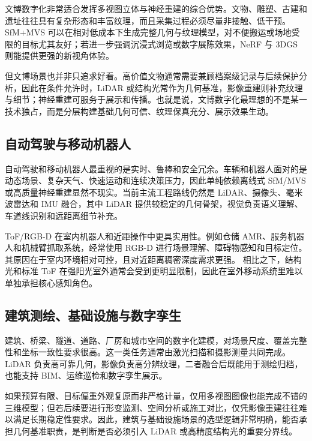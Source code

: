\documentclass[12pt,a4paper]{ctexart}
\begin{document}
文博数字化非常适合发挥多视图立体与神经重建的综合优势。文物、雕塑、古建和遗址往往具有复杂形态和丰富纹理，而且采集过程必须尽量非接触、低干预。SfM+MVS 可以在相对低成本下生成完整几何与纹理模型，对不便搬运或场地受限的目标尤其友好；若进一步强调沉浸式浏览或数字展陈效果，NeRF 与 3DGS 则能提供更强的新视角体验。\cite{schonberger2016sfm,schoeps2017eth3d,mildenhall2020nerf,kerbl2023gaussian}

但文博场景也并非只追求好看。高价值文物通常需要兼顾档案级记录与后续保护分析，因此在条件允许时，LiDAR 或结构光常作为几何基准，影像重建则补充纹理与细节；神经重建可服务于展示和传播。也就是说，文博数字化最理想的不是某一技术独占，而是分层构建基础几何可信、纹理保真充分、展示效果生动。

\subsection{自动驾驶与移动机器人}

自动驾驶和移动机器人最重视的是实时、鲁棒和安全冗余。车辆和机器人面对的是动态场景、复杂天气、快速运动和连续决策压力，因此单纯依赖离线式 SfM/MVS 或高质量神经重建显然不现实。当前主流工程路线仍然是 LiDAR、摄像头、毫米波雷达和 IMU 融合，其中 LiDAR 提供较稳定的几何骨架，视觉负责语义理解、车道线识别和远距离细节补充。\cite{cheng2018laser}

ToF/RGB-D 在室内机器人和近距操作中更具实用性。例如仓储 AMR、服务机器人和机械臂抓取系统，经常使用 RGB-D 进行场景理解、障碍物感知和目标定位。其原因在于室内环境相对可控，且对近距离稠密深度需求更强。\cite{foix2011tof,khoshelham2012kinect} 相比之下，结构光和标准 ToF 在强阳光室外通常会受到更明显限制，因此在室外移动系统里难以单独承担核心感知角色。

\subsection{建筑测绘、基础设施与数字孪生}

建筑、桥梁、隧道、道路、厂房和城市空间的数字化建模，对场景尺度、覆盖完整性和坐标一致性要求很高。这一类任务通常由激光扫描和摄影测量共同完成。LiDAR 负责高可靠几何，影像负责高分辨纹理，二者融合后既能用于测绘归档，也能支持 BIM、运维巡检和数字孪生展示。\cite{cheng2018laser,schonberger2016sfm}

如果预算有限、目标偏重外观复原而非严格计量，仅用多视图图像也能完成不错的三维模型；但若后续要进行形变监测、空间分析或施工对比，仅凭影像重建往往难以满足长期稳定性要求。因此，建筑与基础设施场景的选型逻辑非常明确，能否承担几何基准职责，是判断是否必须引入 LiDAR 或高精度结构光的重要分界线。
\end{document}
